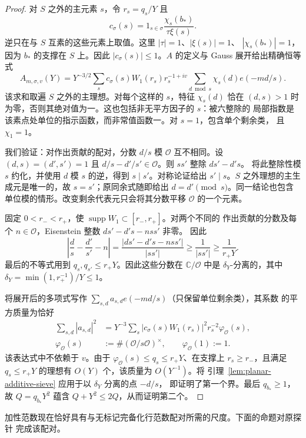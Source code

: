 \begin{proof}
对 $S$ 之外的主元素 $s$，令 $r_s=q_s/Y$ 且
\[
 c_\sigma(s)=1_{s\in\sigma}\frac{\chi_s(b_*)}{\tau\xi(s)}.
\]
逆只在与 $S$ 互素的这些元素上取值。这里 $|\tau|=1$、$|\xi(s)|=1$、
$|\chi_s(b_*)|=1$，因为 $b_*$ 的支撑在 $S$ 上。因此
$|c_\sigma(s)|\le1$。$A$ 的定义与 Gauss 展开给出精确恒等式
\[
 A_{m,\sigma,v}(Y)
 =Y^{-3/2}\sum_s c_\sigma(s)W_1(r_s)r_s^{-1+iv}
       \sum_{d\bmod s}\chi_s(d)e(-md/s).
\]
该求和取遍 $S$ 之外的主理想。对每个这样的 $s$，特征 $\chi_s(d)$ 恰在
$(d,s)>1$ 时为零，否则其绝对值为一。这也包括非无平方因子的 $s$：被六整除的
局部指数是该素点处单位的指示函数，而非常值函数一。对 $s=1$，包含单个剩余类，
且 $\chi_1=1$。

我们验证：对作出贡献的配对，分数 $d/s$ 模 $\mathcal O$ 互不相同。设
$(d,s)=(d',s')=1$ 且 $d/s-d'/s'\in\mathcal O$。则 $ss'$ 整除 $ds'-d's$。
将此整除性模 $s$ 约化，并使用 $d$ 模 $s$ 的逆，得到 $s\mid s'$。对称论证给出
$s'\mid s$。$S$ 之外理想的主生成元是唯一的，故 $s=s'$；原同余式随即给出
$d=d'\pmod s$。同一结论也包含单位模的情形。改变剩余代表元只会将其分数平移
$\mathcal O$ 的一个元素。

固定 $0<r_-<r_+$，使 $\operatorname{supp}W_1\subset[r_-,r_+]$。对两个不同的
作出贡献的分数及每个 $n\in\mathcal O$，Eisenstein 整数 $ds'-d's-nss'$ 非零。
因此
\[
 \left|\frac d s-\frac{d'}{s'}-n\right|
 =\frac{|ds'-d's-nss'|}{|ss'|}
 \ge\frac1{|ss'|}\ge\frac1{r_+Y}.
\]
最后的不等式用到 $q_s,q_{s'}\le r_+Y$。因此这些分数在 $\mathbb C/\mathcal O$
中是 $\delta_Y$-分离的，其中 $\delta_Y=\min(1,r_+^{-1})/Y\le1$。

将展开后的多项式写作 $\sum_{s,d}a_{s,d}e(-md/s)$（只保留单位剩余类），其系数
的平方质量为恰好
\[
 \begin{split}
 \sum_{s,d}|a_{s,d}|^2
 &=Y^{-3}\sum_s |c_\sigma(s)W_1(r_s)|^2r_s^{-2}
       \varphi_{\mathcal O}(s),\\
 \varphi_{\mathcal O}(s)
 &:=\#(\mathcal O/s\mathcal O)^\times,\qquad
 \varphi_{\mathcal O}(1):=1.
 \end{split}
\]
该表达式中不依赖于 $v$。由于
$\varphi_{\mathcal O}(s)\le q_s\le r_+Y$、在支撑上 $r_s\ge r_-$，且满足
$q_s\le r_+Y$ 的理想有 $O(Y)$ 个，该质量为 $O(Y^{-1})$。将
引理~\ref{lem:planar-additive-sieve} 应用于以 $\delta_Y$ 分离的点 $-d/s$，
即证明了第一个界。最后 $q_{b_*}\ge1$，故 $Q=q_{b_*}Y^2$ 蕴含
$Q+Y^2\le2Q$，从而证明第二个。
\end{proof}

加性范数现在恰好具有与无标记完备化行范数配对所需的尺度。下面的命题对原探针
完成该配对。

